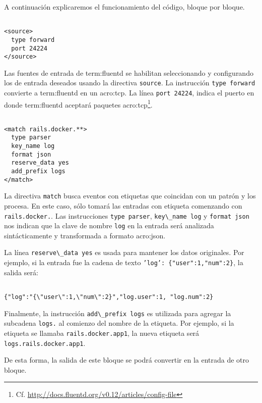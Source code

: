 A continuación explicaremos el funcionamiento del código, bloque por bloque.

\begin{lstlisting}

<source>
  type forward
  port 24224
</source>

\end{lstlisting}

Las fuentes de entrada de \gls{term:fluentd} se habilitan seleccionando y
configurando los  de entrada deseados usando la directiva
\lstinline{source}. La instrucción \lstinline{type forward} convierte a
\gls{term:fluentd} en un  \gls{acro:tcp}. La línea
\lstinline{port 24224}, indica el puerto en donde \gls{term:fluentd} aceptará
paquetes \gls{acro:tcp}\footnote{Cf.
\url{http://docs.fluentd.org/v0.12/articles/config-file}}.

\begin{lstlisting}

<match rails.docker.**>
  type parser
  key_name log
  format json
  reserve_data yes
  add_prefix logs
</match>

\end{lstlisting}

La directiva \lstinline{match} busca eventos con etiquetas que coincidan con un
patrón y los procesa. En este caso, sólo tomará las entradas con etiqueta
comenzando con \lstinline{rails.docker.}. Las instrucciones
\lstinline{type parser}, \lstinline{key\_name log} y \lstinline{format json}
nos indican que la clave de nombre \lstinline{log} en la entrada será analizada
sintácticamente y transformada a formato \gls{acro:json}.

La línea \lstinline{reserve\_data yes} es usada para mantener los datos
originales. Por ejemplo, si la entrada fue la cadena de texto
\texttt{'log': \{"user":1,"num":2\}}, la salida será:

\begin{lstlisting}

{"log":"{\"user\":1,\"num\":2}","log.user":1, "log.num":2}

\end{lstlisting}

Finalmente, la instrucción \lstinline{add\_prefix logs} es utilizada para
agregar la subcadena \lstinline{logs.} al comienzo del nombre de la etiqueta.
Por ejemplo, si la etiqueta se llamaba \lstinline{rails.docker.app1}, la nueva
etiqueta será \lstinline{logs.rails.docker.app1}.

De esta forma, la salida de este bloque se podrá convertir en la entrada de
otro bloque.

